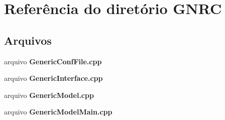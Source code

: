 \section{Referência do diretório G\+N\+RC}
\label{dir_dd18849eb97dc9def2ec501d3fa15e33}
\subsection*{Arquivos}
\begin{DoxyCompactItemize}
\item 
arquivo {\bf Generic\+Conf\+File.\+cpp}
\item 
arquivo {\bf Generic\+Interface.\+cpp}
\item 
arquivo {\bf Generic\+Model.\+cpp}
\item 
arquivo {\bf Generic\+Model\+Main.\+cpp}
\end{DoxyCompactItemize}
